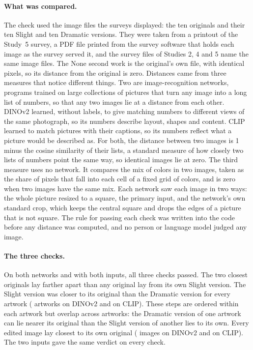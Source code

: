 \paragraph*{What was compared.}
The check used the image files the surveys displayed: the ten originals and their ten Slight and ten Dramatic versions. They were taken from a printout of the Study~5 survey, a PDF file printed from the survey software that holds each image as the survey served it, and the survey files of Studies 2, 4 and 5 name the same image files. The None second work is the original's own file, with identical pixels, so its distance from the original is zero. Distances came from three measures that notice different things. Two are image-recognition networks, programs trained on large collections of pictures that turn any image into a long list of numbers, so that any two images lie at a distance from each other.\cite{oquab2024dinov2,radford2021learning} DINOv2 learned, without labels, to give matching numbers to different views of the same photograph, so its numbers describe layout, shapes and content. CLIP learned to match pictures with their captions, so its numbers reflect what a picture would be described as. For both, the distance between two images is 1 minus the cosine similarity of their lists, a standard measure of how closely two lists of numbers point the same way, so identical images lie at zero. The third measure uses no network. It compares the mix of colors in two images, taken as the share of pixels that fall into each cell of a fixed grid of colors, and is zero when two images have the same mix. Each network saw each image in two ways: the whole picture resized to a square, the primary input, and the network's own standard crop, which keeps the central square and drops the edges of a picture that is not square. The rule for passing each check was written into the code before any distance was computed, and no person or language model judged any image.

\paragraph*{The three checks.}
On both networks and with both inputs, all three checks passed. The two closest originals lay farther apart than any original lay from its own Slight version. The Slight version was closer to its original than the Dramatic version for every artwork (\XSImageCheckTwoDINO{} artworks on DINOv2 and \XSImageCheckTwoCLIP{} on CLIP). These steps are ordered within each artwork but overlap across artworks: the Dramatic version of one artwork can lie nearer its original than the Slight version of another lies to its own. Every edited image lay closest to its own original (\XSImageCheckThreeDINO{} images on DINOv2 and \XSImageCheckThreeCLIP{} on CLIP). The two inputs gave the same verdict on every check.

